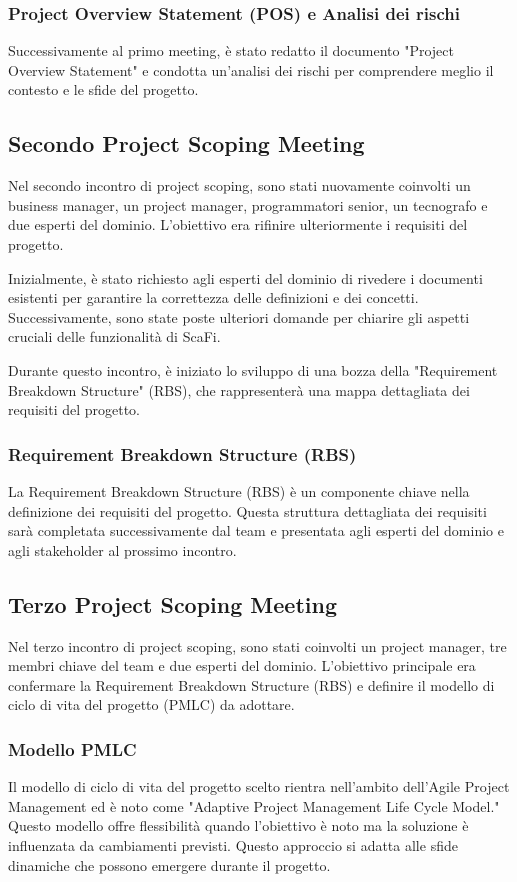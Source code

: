 \subsubsection{Project Overview Statement (POS) e Analisi dei rischi}
Successivamente al primo meeting, è stato redatto il documento "Project Overview Statement" e condotta un'analisi dei rischi per 
comprendere meglio il contesto e le sfide del progetto.

\subsection{Secondo Project Scoping Meeting}
Nel secondo incontro di project scoping, sono stati nuovamente coinvolti un business manager, un project manager, programmatori senior, 
un tecnografo e due esperti del dominio. L'obiettivo era rifinire ulteriormente i requisiti del progetto.

Inizialmente, è stato richiesto agli esperti del dominio di rivedere i documenti esistenti per garantire la correttezza delle definizioni 
e dei concetti. Successivamente, sono state poste ulteriori domande per chiarire gli aspetti cruciali delle funzionalità di ScaFi.

Durante questo incontro, è iniziato lo sviluppo di una bozza della "Requirement Breakdown Structure" (RBS), che rappresenterà una mappa 
dettagliata dei requisiti del progetto.

\subsubsection{Requirement Breakdown Structure (RBS)}
La Requirement Breakdown Structure (RBS) è un componente chiave nella definizione dei requisiti del progetto. Questa struttura dettagliata 
dei requisiti sarà completata successivamente dal team e presentata agli esperti del dominio e agli stakeholder al prossimo incontro.

\subsection{Terzo Project Scoping Meeting}
Nel terzo incontro di project scoping, sono stati coinvolti un project manager, tre membri chiave del team e due esperti del dominio. 
L'obiettivo principale era confermare la Requirement Breakdown Structure (RBS) e definire il modello di ciclo di vita del progetto (PMLC) 
da adottare.

\subsubsection{Modello PMLC}
Il modello di ciclo di vita del progetto scelto rientra nell'ambito dell'Agile Project Management ed è noto come 
"Adaptive Project Management Life Cycle Model." Questo modello offre flessibilità quando l'obiettivo è noto ma la soluzione è influenzata 
da cambiamenti previsti. Questo approccio si adatta alle sfide dinamiche che possono emergere durante il progetto.

